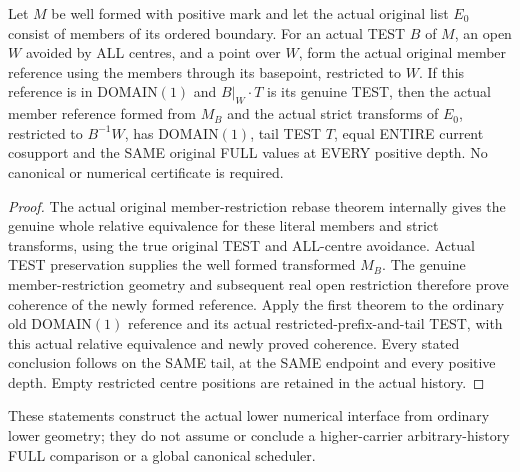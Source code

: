 \begin{theorem}
\label{hir:original-curve-member-reference-full-rebase}
\leanok
Let $M$ be well formed with positive mark and let the actual original list
$E_0$ consist of members of its ordered boundary. For an actual TEST $B$
of $M$, an open $W$ avoided by ALL centres, and a point over $W$, form the
actual original member reference using the members through its basepoint,
restricted to $W$. If this reference is in DOMAIN$(1)$ and
$B|_W\mathbin{\cdot}T$ is its genuine TEST, then the actual member
reference formed from $M_B$ and the actual strict transforms of $E_0$,
restricted to $B^{-1}W$, has DOMAIN$(1)$, tail TEST $T$, equal ENTIRE
current cosupport and the SAME original FULL values at EVERY positive
depth. No canonical or numerical certificate is required.
\end{theorem}
\begin{proof}
The actual original member-restriction rebase theorem internally gives
the genuine whole relative equivalence for these literal members and
strict transforms, using the true original TEST and ALL-centre avoidance.
Actual TEST preservation supplies the well formed transformed $M_B$.
The genuine member-restriction geometry and subsequent real open
restriction therefore prove coherence of the newly formed reference.
Apply the first theorem to the ordinary old DOMAIN$(1)$ reference and
its actual restricted-prefix-and-tail TEST, with this actual relative
equivalence and newly proved coherence. Every stated conclusion follows
on the SAME tail, at the SAME endpoint and every positive depth. Empty
restricted centre positions are retained in the actual history.
\end{proof}

These statements construct the actual lower numerical interface from
ordinary lower geometry; they do not assume or conclude a higher-carrier
arbitrary-history FULL comparison or a global canonical scheduler.
